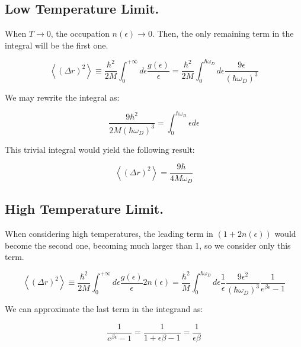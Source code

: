 \documentclass[a4paper,12pt]{article}
\begin{document}
\subsection{Low Temperature Limit.}

When $T \to 0$, the occupation $n(\epsilon) \to 0$. Then, the only remaining term in the integral will be the first one.

\begin{equation}
\left\langle ( \Delta r ) ^ { 2 } \right\rangle \equiv \frac { \hbar ^ { 2 } } { 2 M } \int _ { 0 } ^ { + \infty } d \epsilon \frac { g ( \epsilon ) } { \epsilon } = \frac { \hbar ^ { 2 } } { 2 M } \int _ { 0 } ^ {  \hbar \omega_{D} } d \epsilon  \frac{9 \epsilon}{(\hbar \omega_{D})^3} 
\label{eq:displa}
\end{equation}

We may rewrite the integral as: 

$$\frac {9 \hbar ^ { 2 } } { 2 M ( \hbar \omega_{D})^3 } = \int _ { 0 } ^ {  \hbar \omega_{D} } \epsilon d \epsilon$$

This trivial integral would yield the following result: 

\begin{equation}
\left\langle ( \Delta r ) ^ { 2 } \right\rangle = \frac{9 \hbar}{4 M  \omega_{D}}
\label{eq:resultlow}
\end{equation}

\subsection{High Temperature Limit.}

When considering high temperatures, the leading term in $(1 + 2n(\epsilon))$ would become the second one, becoming much larger than 1, so we consider only this term. 

\begin{equation}
\left\langle ( \Delta r ) ^ { 2 } \right\rangle \equiv \frac { \hbar ^ { 2 } } { 2 M } \int _ { 0 } ^ { + \infty } d \epsilon \frac { g ( \epsilon ) } { \epsilon } 2 n (\epsilon) = \frac { \hbar ^ { 2 } } {  M } \int _ { 0 } ^ { \hbar \omega_{D}} d \epsilon \frac { 1 } { \epsilon } \frac{9 \epsilon^2}{(\hbar \omega_{D})^3}  \frac{1}{e^{\beta \epsilon} -1}
\label{eq:resulthigh}
\end{equation}

We can approximate the last term in the integrand as: 

$$\frac{1}{e^{\beta \epsilon} -1} = \frac{1}{1 + \epsilon \beta -1 } = \frac{1}{\epsilon \beta}$$
\end{document}
